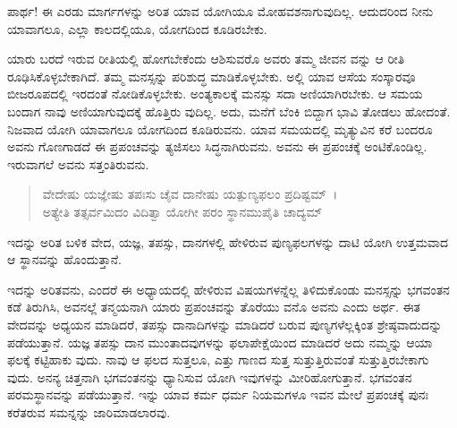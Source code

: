 {\small ಪಾರ್ಥ! ಈ ಎರಡು ಮಾರ್ಗಗಳನ್ನು ಅರಿತ ಯಾವ ಯೋಗಿಯೂ ಮೋಹವಶನಾಗುವುದಿಲ್ಲ. ಆದುದರಿಂದ ನೀನು ಯಾವಾಗಲೂ, ಎಲ್ಲಾ ಕಾಲದಲ್ಲಿಯೂ, ಯೋಗದಿಂದ ಕೂಡಿರಬೇಕು.}

ಯಾರು ಬರದೆ ಇರುವ ರೀತಿಯಲ್ಲಿ ಹೋಗಬೇಕೆಂದು ಆಶಿಸುವರೊ ಅವರು ತಮ್ಮ ಜೀವನ ವನ್ನು ಆ ರೀತಿ ರೂಢಿಸಿಕೊಳ್ಳಬೇಕಾಗಿದೆ. ತಮ್ಮ ಮನಸ್ಸನ್ನು ಪರಿಶುದ್ಧ ಮಾಡಿಕೊಳ್ಳಬೇಕು. ಅಲ್ಲಿ ಯಾವ ಆಸೆಯ ಸಂಸ್ಕಾರವೂ ಬೀಜರೂಪದಲ್ಲಿ ಇರದಂತೆ ನೋಡಿಕೊಳ್ಳಬೇಕು. ಅಂತ್ಯಕಾಲಕ್ಕೆ ಮನಸ್ಸು ಸದಾ ಅಣಿಯಾಗಿರಬೇಕು. ಆ ಸಮಯ ಬಂದಾಗ ನಾವು ಅಣಿಯಾಗುವುದಕ್ಕೆ ಹೊತ್ತಿರು ವುದಿಲ್ಲ. ಅದು, ಮನೆಗೆ ಬೆಂಕಿ ಬಿದ್ದಾಗ ಭಾವಿ ತೋಡಲು ಹೋದಂತೆ. ನಿಜವಾದ ಯೋಗಿ ಯಾವಾಗಲೂ ಯೋಗದಿಂದ ಕೂಡಿರುವನು. ಯಾವ ಸಮಯದಲ್ಲಿ ಮೃತ್ಯುವಿನ ಕರೆ ಬಂದರೂ ಅವನು ಗೊಣಗಾಡದೆ ಈ ಪ್ರಪಂಚವನ್ನು ತ್ಯಜಿಸಲು ಸಿದ್ಧನಾಗಿರುವನು. ಅವನು ಈ ಪ್ರಪಂಚಕ್ಕೆ ಅಂಟಿಕೊಂಡಿಲ್ಲ. ಇರುವಾಗಲೆ ಅವನು ಸತ್ತಂತಿರುವನು.

\begin{verse}
ವೇದೇಷು ಯಜ್ಞೇಷು ತಪಃಸು ಚೈವ ದಾನೇಷು ಯತ್ಪುಣ್ಯಫಲಂ ಪ್ರದಿಷ್ಟಮ್~।\\ಅತ್ಯೇತಿ ತತ್ಸರ್ವಮಿದಂ ವಿದಿತ್ವಾ ಯೋಗೀ ಪರಂ ಸ್ಥಾನಮುಪೈತಿ ಚಾದ್ಯಮ್ 
\end{verse}

{\small ಇದನ್ನು ಅರಿತ ಬಳಿಕ ವೇದ, ಯಜ್ಞ, ತಪಸ್ಸು, ದಾನಗಳಲ್ಲಿ ಹೇಳಿರುವ ಪುಣ್ಯಫಲಗಳನ್ನು ದಾಟಿ ಯೋಗಿ ಉತ್ತಮವಾದ ಆ ಸ್ಥಾನವನ್ನು ಹೊಂದುತ್ತಾನೆ. }

ಇದನ್ನು ಅರಿತವನು, ಎಂದರೆ ಈ ಅಧ್ಯಾಯದಲ್ಲಿ ಹೇಳಿರುವ ವಿಷಯಗಳನ್ನೆಲ್ಲ ತಿಳಿದುಕೊಂಡು ಮನಸ್ಸನ್ನು ಭಗವಂತನ ಕಡೆ ತಿರುಗಿಸಿ, ಅವನಲ್ಲೆ ತನ್ಮಯನಾಗಿ ಯಾರು ಪ್ರಪಂಚವನ್ನು ತೊರೆಯು ವನೊ ಅವನು ಎಂದು ಅರ್ಥ. ಈತ ವೇದವನ್ನು ಅಧ್ಯಯನ ಮಾಡಿದರೆ, ತಪಸ್ಸು ದಾನಾದಿಗಳನ್ನು ಮಾಡಿದರೆ ಬರುವ ಪುಣ್ಯಗಳೆಲ್ಲಕ್ಕಿಂತ ಶ್ರೇಷ್ಠವಾದುದನ್ನು ಪಡೆಯುತ್ತಾನೆ. ಯಜ್ಞ ತಪಸ್ಸು ದಾನ ಮುಂತಾದವುಗಳನ್ನು ಫಲಾಪೇಕ್ಷೆಯಿಂದ ಮಾಡಿದರೆ ಅದು ನಮ್ಮನ್ನು ಆಯಾ ಫಲಕ್ಕೆ ಕಟ್ಟಿಹಾಕು ವುದು. ನಾವು ಆ ಫಲದ ಸುತ್ತಲೂ, ಎತ್ತು ಗಾಣದ ಸುತ್ತ ಸುತ್ತುತ್ತಿರುವಂತೆ ಸುತ್ತುತ್ತಿರಬೇಕಾಗು ವುದು. ಅನನ್ಯ ಚಿತ್ತನಾಗಿ ಭಗವಂತನನ್ನು ಧ್ಯಾನಿಸುವ ಯೋಗಿ ಇವುಗಳನ್ನು ಮೀರಿಹೋಗುತ್ತಾನೆ. ಭಗವಂತನ ಪರಮಸ್ಥಾನವನ್ನು ಪಡೆಯುತ್ತಾನೆ. ಇನ್ನು ಯಾವ ಕರ್ಮ ಧರ್ಮ ನಿಯಮಗಳೂ ಇವನ ಮೇಲೆ ಪ್ರಪಂಚಕ್ಕೆ ಪುನಃ ಕರೆತರುವ ಸಮನ್ನನ್ನು ಜಾರಿಮಾಡಲಾರವು.

